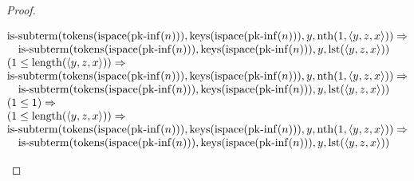 \documentclass[11pt]{article}
\theoremstyle{plain}
\begin{document}
\begin{proof}
\begin{itemize}[leftmargin=2.8em, itemsep=4pt, parsep=1pt]
\begin{itemize}[leftmargin=2.8em, itemsep=4pt, parsep=1pt]
\begin{equation*}
\begin{array}{@{}l@{}}
\begin{array}{@{}l@{}} \operatorname{is\text{-}subterm}(\operatorname{tokens}(\operatorname{ispace}(\operatorname{pk\text{-}inf}(n))), \operatorname{keys}(\operatorname{ispace}(\operatorname{pk\text{-}inf}(n))), y, \operatorname{nth}(1, \langle y, z, x \rangle)) \Rightarrow  \\ \quad \operatorname{is\text{-}subterm}(\operatorname{tokens}(\operatorname{ispace}(\operatorname{pk\text{-}inf}(n))), \operatorname{keys}(\operatorname{ispace}(\operatorname{pk\text{-}inf}(n))), y, \operatorname{lst}(\langle y, z, x \rangle)) \end{array} \\
\begin{array}{@{}l@{}} (1 \leq \operatorname{length}(\langle y, z, x \rangle)) \Rightarrow  \\ \operatorname{is\text{-}subterm}(\operatorname{tokens}(\operatorname{ispace}(\operatorname{pk\text{-}inf}(n))), \operatorname{keys}(\operatorname{ispace}(\operatorname{pk\text{-}inf}(n))), y, \operatorname{nth}(1, \langle y, z, x \rangle)) \Rightarrow  \\ \quad \operatorname{is\text{-}subterm}(\operatorname{tokens}(\operatorname{ispace}(\operatorname{pk\text{-}inf}(n))), \operatorname{keys}(\operatorname{ispace}(\operatorname{pk\text{-}inf}(n))), y, \operatorname{lst}(\langle y, z, x \rangle)) \end{array} \\
\begin{array}{@{}l@{}} (1 \leq 1) \Rightarrow  \\ (1 \leq \operatorname{length}(\langle y, z, x \rangle)) \Rightarrow  \\ \operatorname{is\text{-}subterm}(\operatorname{tokens}(\operatorname{ispace}(\operatorname{pk\text{-}inf}(n))), \operatorname{keys}(\operatorname{ispace}(\operatorname{pk\text{-}inf}(n))), y, \operatorname{nth}(1, \langle y, z, x \rangle)) \Rightarrow  \\ \quad \operatorname{is\text{-}subterm}(\operatorname{tokens}(\operatorname{ispace}(\operatorname{pk\text{-}inf}(n))), \operatorname{keys}(\operatorname{ispace}(\operatorname{pk\text{-}inf}(n))), y, \operatorname{lst}(\langle y, z, x \rangle)) \end{array} \\

\end{array}
\end{equation*}
\end{itemize}
\end{itemize}
\end{proof}
\end{document}

